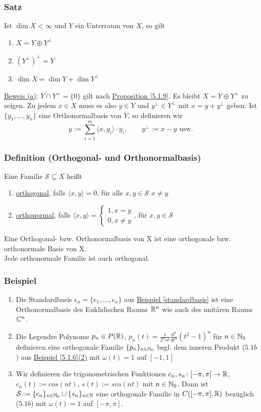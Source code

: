 \subsubsection{Satz}
\label{5.1.10}
Ist $\dim X<\infty$ und $Y$ ein Unterraum von $X$, so gilt
\alphabet
\begin{enumerate}
\item $X=Y\oplus Y^{\bot}$
\item $(Y^{\bot})^{\bot}=Y$
\item $\dim X=\dim Y+\dim Y^{\bot}$
\end{enumerate}
\underline{Beweis (a)}: $Y\cap Y^{\bot}=\{0\}$ gilt nach \hyperref[5.1.9]{Proposition \ref*{5.1.9}}. Es bleibt $X=Y\oplus Y^{\bot}$ zu zeigen. Zu jedem $x\in X$ muss es also $y\in Y$ und $y^{\bot}\in Y^{\bot}$ mit $x=y+y^{\bot}$ geben. Ist $\{y_1, \dots,y_n\}$ eine Orthonormalbasis von $Y$, so definieren wir
\[y:=\sum_{i=1}^m \langle x,y_i\rangle \cdot y_i,\qquad y^{\bot}:=x-y\text{ usw.}\]
\subsubsection{Definition (Orthogonal- und Orthonormalbasis)}
Eine Familie $\mathcal{S} \subseteq X$ heißt
\alphabet
\begin{enumerate}
\item \underline{orthogonal}, falls $\langle x,y\rangle=0$, für alle $x,y\in \mathcal{S}$ $x\neq y$
\item \underline{orthonormal}, falls $\langle x,y\rangle=\begin{cases}1,x=y\\0,x\neq y\end{cases}$, für $x,y\in \mathcal{S}$
\end{enumerate}
Eine Orthogonal- bzw. Orthonormalbasis von X ist eine orthogonale bzw. orthonormale Basis von X.\\
Jede orthonormale Familie ist auch orthogonal.
\subsubsection{Beispiel}
\label{5.1.12}
\numbers
\begin{enumerate}
\item Die Standardbasis $\epsilon_n=\{e_1,\dots,e_n\}$ aus \hyperref[standardbasis]{Beispiel \ref*{standardbasis}} ist eine Orthonormalbasis des Euklidischen Raums $\mathbb{R}^n$ wie auch des unitären Raums $\mathbb{C}^n$.
\item Die Legendre Polynome $p_n\in P(\mathbb{R})$, $p_n(t)=\frac{1}{2^n n!} \frac{d^n}{dt^n} (t^2-1)^n$ für $n\in\mathbb{N}_0$ definieren eine orthogonale Familie $\{p_n\}_{n\in\mathbb{N}_0}$ bzgl. dem inneren Produkt (\hyperref[5.1b]{$5.1b$}) aus \hyperref[5.1.6]{Beispiel \ref{5.1.6}(2)} mit $\omega(t)=1$ auf $[-1,1]$
\item Wir definieren die trigonometrischen Funktionen $c_n,s_n\colon[-\pi,\pi]\rightarrow\mathbb{R}$, $c_n(t):=cos(nt)$, $s(t):=sin(nt)$ mit $n\in\mathbb{N}_0$. Dann ist $\mathcal{S}:=\{c_n\}_{n\in\mathbb{N}_0} \cup \{s_n\}_{n\in\mathbb{N}}$ eine orthogonale Familie in $C([-\pi,\pi],\mathbb{R})$ bezüglich (\hyperref[5.1b]{$5.1b$}) mit $\omega(t)=1$ auf $[-\pi,\pi]$.
\end{enumerate}
